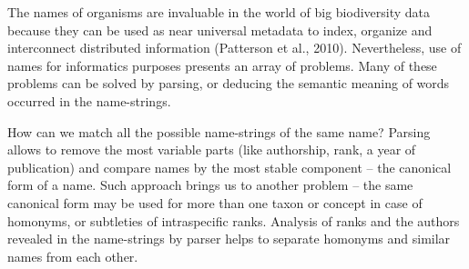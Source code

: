 \documentclass{bmcart}
\begin{document}
The names of organisms are invaluable in the world of big biodiversity data
because they can be used as near universal metadata to index, organize and
interconnect distributed information (Patterson et al., 2010). Nevertheless,
use of names for informatics purposes presents an array of problems. Many of
these problems can be solved by parsing, or deducing the semantic meaning of
words occurred in the name-strings. 

How can we match all the possible name-strings of the same name? Parsing allows
to remove the most variable parts (like authorship, rank, a year of
publication) and compare names by the most stable component -- the canonical
form of a name. Such approach brings us to another problem -- the same
canonical form may be used for more than one taxon or concept in case of
homonyms, or subtleties of intraspecific ranks. Analysis of ranks and the
authors revealed in the name-strings by parser helps to separate homonyms and
similar names from each  other.  
\end{document}
